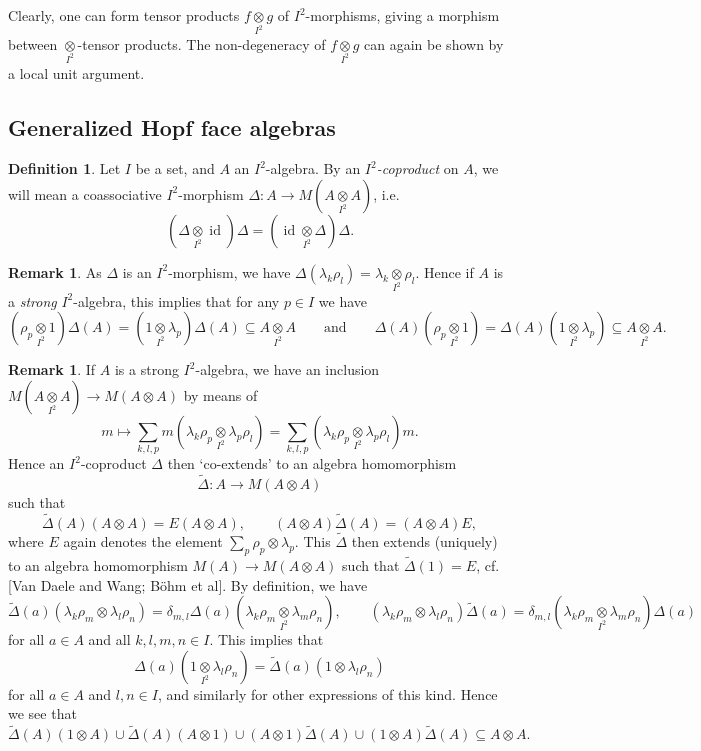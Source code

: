 \documentclass[12pt]{article}
\theoremstyle{change}
\DeclareMathOperator{\id}{id}
\newcommand{\itimes}{\underset{I^2}{\otimes}}
\newcommand{\wDelta}{\widetilde{\Delta}}
\theoremstyle{definition}
\newtheorem{Def}[Theorem]{Definition}
\newtheorem{Rem}[Theorem]{Remark}
\numberwithin{equation}{section}
\begin{document}
Clearly, one can form tensor products $f\itimes g$ of $I^2$-morphisms, giving a morphism between $\itimes$-tensor products. The non-degeneracy of $f\itimes g$ can again be shown by a local unit argument.

\subsection{Generalized Hopf face algebras}

\begin{Def} Let $I$ be a set, and $A$ an $I^2$-algebra. By an \emph{$I^2$-coproduct} on $A$, we will mean a coassociative $I^2$-morphism $\Delta:A\rightarrow M(A\itimes A)$, i.e. \[(\Delta\itimes \id)\Delta = (\id\itimes \Delta)\Delta.\]
\end{Def}

\begin{Rem}\label{RemMult} As $\Delta$ is an $I^2$-morphism, we have $\Delta(\lambda_k\rho_l) =\lambda_k\itimes \rho_l$. Hence if $A$ is a \emph{strong} $I^2$-algebra, this implies that for any $p\in I$ we have \[(\rho_p\itimes 1)\Delta(A) = (1\itimes \lambda_p)\Delta(A) \subseteq A\itimes A \qquad \textrm{and}\qquad \Delta(A)(\rho_p\itimes 1)= \Delta(A)(1\itimes \lambda_p) \subseteq A\itimes A.\]
\end{Rem}

\begin{Rem} If $A$ is a strong $I^2$-algebra, we have an inclusion $M(A\itimes A)\rightarrow M(A\otimes A)$ by means of \[m\mapsto \sum_{k,l,p} m(\lambda_k\rho_p\itimes \lambda_p\rho_l) = \sum_{k,l,p} (\lambda_k\rho_p\itimes \lambda_p\rho_l)m.\] Hence an $I^2$-coproduct $\Delta$ then `co-extends' to an algebra homomorphism \[\wDelta: A\rightarrow M(A\otimes A)\] such that \[\wDelta(A)(A\otimes A) = E(A\otimes A),\qquad (A\otimes A)\wDelta(A) = (A\otimes A)E,\] where $E$ again denotes the element $\sum_{p}\rho_p\otimes \lambda_p$. This $\wDelta$ then extends (uniquely) to an algebra homomorphism $M(A)\rightarrow M(A\otimes A)$ such that $\wDelta(1) = E$, cf. [Van Daele and Wang; B\"{o}hm et al]. By definition, we have \[\wDelta(a)(\lambda_k\rho_m\otimes \lambda_l\rho_n) = \delta_{m,l}\Delta(a)(\lambda_k\rho_m\itimes \lambda_m\rho_n), \qquad (\lambda_k\rho_m\otimes \lambda_l\rho_n) \wDelta(a)= \delta_{m,l}(\lambda_k\rho_m\itimes \lambda_m\rho_n)\Delta(a)\] for all $a\in A$ and all $k,l,m,n\in I$. This implies that \[\Delta(a)(1\itimes \lambda_l\rho_n) = \wDelta(a)(1\otimes \lambda_l\rho_n)\] for all $a\in A$ and $l,n\in I$, and similarly for other expressions of this kind. Hence we see that \[\wDelta(A)(1\otimes A)\cup \wDelta(A)(A\otimes 1)\cup (A\otimes 1)\wDelta(A)\cup (1\otimes A)\wDelta(A)\subseteq A\otimes A.\]
\end{Rem}
\end{document}
